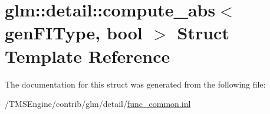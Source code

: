 \hypertarget{structglm_1_1detail_1_1compute__abs}{}\section{glm\+:\+:detail\+:\+:compute\+\_\+abs$<$ gen\+F\+I\+Type, bool $>$ Struct Template Reference}
\label{structglm_1_1detail_1_1compute__abs}


The documentation for this struct was generated from the following file\+:\begin{DoxyCompactItemize}
\item 
/\+T\+M\+S\+Engine/contrib/glm/detail/\hyperlink{func__common_8inl}{func\+\_\+common.\+inl}\end{DoxyCompactItemize}
